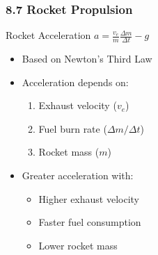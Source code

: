 \documentclass[aspectratio=169]{beamer}
\begin{document}
\begin{frame}
\frametitle{8.7 Rocket Propulsion}

\begin{block}{Rocket Acceleration}
$a = \frac{v_e}{m}\frac{\Delta m}{\Delta t} - g$
\end{block}

\begin{itemize}
\item Based on Newton's Third Law
\item Acceleration depends on:
    \begin{enumerate}
    \item Exhaust velocity ($v_e$)
    \item Fuel burn rate ($\Delta m/\Delta t$)
    \item Rocket mass ($m$)
    \end{enumerate}
\item Greater acceleration with:
    \begin{itemize}
    \item Higher exhaust velocity
    \item Faster fuel consumption
    \item Lower rocket mass
    \end{itemize}
\end{itemize}
\end{frame}

\end{document}
